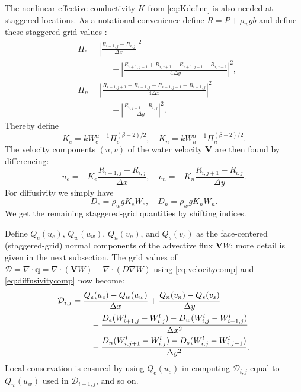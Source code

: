 \documentclass[gmd]{copernicus}   %
\newcommand\bV{\mathbf{V}}
\newcommand\bq{\mathbf{q}}
\newcommand{\Div}{\nabla\cdot}
\newcommand{\grad}{\nabla}
\newcommand{\Wlij}{W^l_{i,j}}
\begin{document}
The nonlinear effective conductivity $K$ from \eqref{eq:Kdefine} is also needed at staggered locations.  As a notational convenience define $R=P+\rho_w g b$ and define these staggered-grid values \citep[compare][]{Mahaffy}:
\begin{align*}
&\Pi_e = \left|\frac{R_{i+1,j}-R_{i,j}}{\Delta x}\right|^2 \\
&\qquad \qquad + \left|\frac{R_{i+1,j+1}+R_{i,j+1} - R_{i+1,j-1}-R_{i,j-1}}{4\Delta y}\right|^2, \\
&\Pi_n = \left|\frac{R_{i+1,j+1}+R_{i+1,j} - R_{i-1,j+1}-R_{i-1,j}}{4\Delta x}\right|^2 \\
&\qquad \qquad + \left|\frac{R_{i,j+1}-R_{i,j}}{\Delta y}\right|^2.
\end{align*}
Thereby define
\begin{equation}
K_e = k W_e^{\alpha-1} \Pi_e^{(\beta-2)/2}, \quad K_n = k W_n^{\alpha-1} \Pi_n^{(\beta-2)/2}.  \label{eq:stagK}
\end{equation}
The velocity components $(u,v)$ of the water velocity $\mathbf{V}$ are then found by differencing:
\begin{equation}
u_e = - K_e \frac{R_{i+1,j}-R_{i,j}}{\Delta x}, \quad v_n = - K_n \frac{R_{i,j+1}-R_{i,j}}{\Delta y}.  \label{eq:velocitycomp}
\end{equation}
For diffusivity we simply have
\begin{equation}
D_e = \rho_w g K_e W_e, \quad D_n = \rho_w g K_n W_n.  \label{eq:diffusivitycomp}
\end{equation}
We get the remaining staggered-grid quantities by shifting indices.

Define $Q_e(u_e)$, $Q_w(u_w)$, $Q_n(v_n)$, and $Q_s(v_s)$ as the face-centered (staggered-grid) normal components of the advective flux $\bV W$; more detail is given in the next subsection.  The grid values of $\mathcal{D} = \Div \bq = \Div (\bV W) - \Div (D \grad W)$ using \eqref{eq:velocitycomp} and \eqref{eq:diffusivitycomp} now become:
\begin{align}
&\mathcal{D}_{i,j} =  \frac{Q_e(u_e) - Q_w(u_w)}{\Delta x} + \frac{Q_n(v_n) - Q_s(v_s)}{\Delta y}  \label{eq:fluxdivgrid} \\
&\qquad \qquad - \frac{D_e (W_{i+1,j}^l - \Wlij) - D_w (\Wlij - W_{i-1,j}^l)}{\Delta x^2} \notag \\
&\qquad \qquad - \frac{D_n (W_{i,j+1}^l - \Wlij) - D_s (\Wlij - W_{i,j-1}^l)}{\Delta y^2}.  \notag
\end{align}
Local conservation is ensured by using $Q_e(u_e)$ in computing $\mathcal{D}_{i,j}$ equal to $Q_w(u_w)$ used in $\mathcal{D}_{i+1,j}$, and so on.
\end{document}
